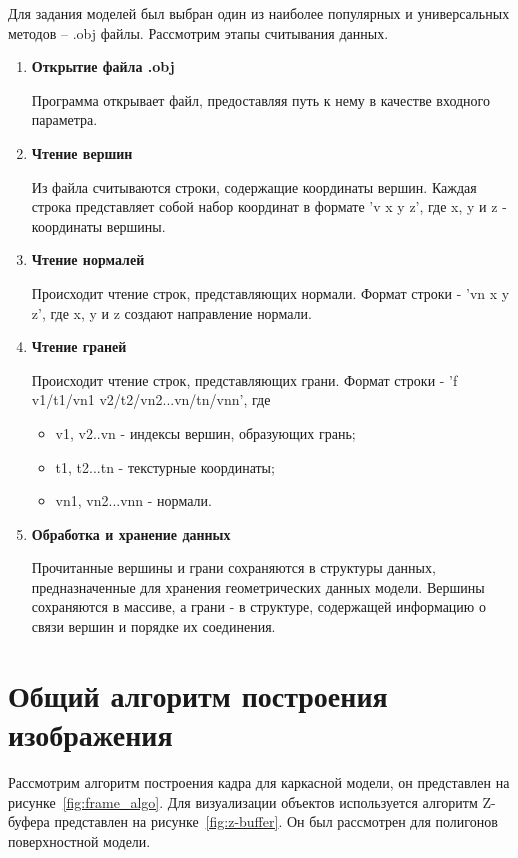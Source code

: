 Для задания моделей был выбран один из наиболее популярных и универсальных методов – .obj файлы. 
Рассмотрим этапы считывания данных.
\begin{enumerate}
	\item \textbf{Открытие файла .obj}
	
	Программа открывает файл, предоставляя путь к нему в качестве входного параметра.
	
	\item \textbf{Чтение вершин}
	
	Из файла считываются строки, содержащие координаты вершин. 
	Каждая строка представляет собой набор координат в формате 'v x y z', где x, y и z - координаты вершины.
	
	\item \textbf{Чтение нормалей}
	
	Происходит чтение строк, представляющих нормали. 
	Формат строки - 'vn x y z', где x, y и z создают направление нормали.
	
	\item \textbf{Чтение граней}
	
	Происходит чтение строк, представляющих грани. 
	Формат строки - 'f v1/t1/vn1 v2/t2/vn2...vn/tn/vnn', где 
	\begin{itemize}
		\item v1, v2..vn - индексы вершин, образующих грань;
		\item t1, t2...tn - текстурные координаты;
		\item vn1, vn2...vnn - нормали.
	\end{itemize}
	
	\item \textbf{Обработка и хранение данных}
	
	Прочитанные вершины и грани сохраняются в структуры данных, предназначенные для хранения геометрических данных 
	модели. 
	Вершины сохраняются в массиве, а грани - в структуре, содержащей информацию о связи вершин и порядке их соединения.
	
\end{enumerate}


\section{Общий алгоритм построения изображения}
Рассмотрим алгоритм построения кадра для каркасной модели, он представлен на рисунке~\ref{fig:frame_algo}. 
Для визуализации объектов используется алгоритм Z-буфера представлен на рисунке~\ref{fig:z-buffer}.
Он был рассмотрен для полигонов поверхностной модели.


